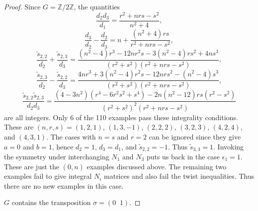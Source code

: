 \documentclass[12pt,psamsfonts]{amsart}
\newcommand{\e}{{\epsilon}}
\newcommand{\Z}{\mathbb Z}
\numberwithin{equation}{section}
\theoremstyle{definition}
\begin{document}
\begin{proof}
Since $G=\Z/2\Z$, the quantities
$$\frac{d_2d_3}{d_1}=\frac{r^2+nrs-s^2}{n^2+4},$$
$$\frac{d_3}{d_2}-\frac{d_2}{d_3}=n+\frac{(n^2+4)rs}{r^2+nrs-s^2},$$
$$\frac{\tilde s_{2,2}}{d_2}+\frac{\tilde s_{2,3}}{d_3}=
\frac{(n^2-4)r^3-12nr^2s-3(n^2-4)rs^2+4ns^3}{(r^2+s^2)(r^2+nrs-s^2)},$$
$$\frac{\tilde s_{2,3}}{d_2}-\frac{\tilde s_{2,2}}{d_3}=
\frac{4nr^3+3(n^2-4)r^2s-12nrs^2-(n^2-4)s^3}{(r^2+s^2)(r^2+nrs-s^2)},$$
$$\frac{\tilde s_{2,2}\tilde s_{2,3}}{d_2d_3} =
\frac{(4-3n^2)(r^4-6r^2s^2+s^4)-2n(n^2-12)rs(r^2-s^2)}{(r^2+s^2)^2(r^2+nrs-s^2)}
$$
are all integers. Only 6 of the 110 examples pass these
integrality conditions. These are $(n,r,s)=(1,2,1)$, $(1,3,-1)$,
$(2,2,2)$, $(3,2,3)$, $(4,2,4)$, and $(4,3,1)$. The cases with
$n=s$ and $r=2$ can be ignored since they give $a=0$ and $b=1$,
hence $d_2=1$, $d_3=d_1$, and $\tilde s_{2,2}=-1$. Thus $\tilde
s_{3,3}=1$. Invoking the symmetry under interchanging $N_1$ and
$N_3$ puts us back in the case $\e_1=1$. These are just the
$(0,n)$ examples discussed above. The remaining two examples fail
to give integral $N_i$ matrices and also fail the twist
inequalities. Thus there are no new examples in this case.

\vspace{.5cm}

 $G$ contains the transposition
$\sigma=(0\;\; 1)$.

\vspace{.5cm}


\end{proof}
\end{document}
